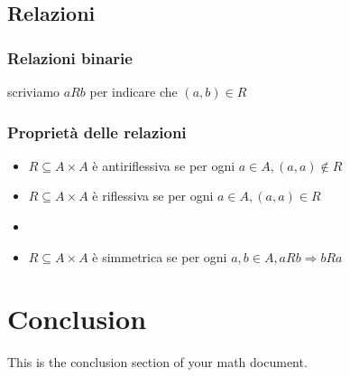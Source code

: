 \documentclass{article}
\begin{document}
\subsection{Relazioni}
\subsubsection{Relazioni binarie}
scriviamo $a R b$ per indicare che $(a,b) \in R$ 

\subsubsection{Proprietà delle relazioni} 
\begin{itemize}
\item $R \subseteq A \times A$  è antiriflessiva se per ogni $a \in A, (a,a) \notin R$
\item $R \subseteq A \times A$  è riflessiva se per ogni $a \in A, (a,a) \in R$
\item 
\item $R \subseteq A \times A$  è simmetrica se per ogni $a,b \in A, a R b \Rightarrow b R a$
\end{itemize}

\section{Conclusion}

This is the conclusion section of your math document.
\end{document}
